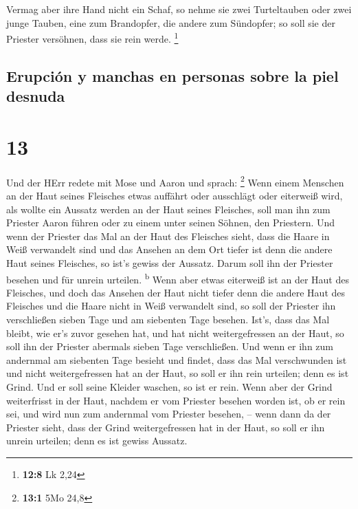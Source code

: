  Vermag aber ihre Hand nicht ein Schaf, so nehme sie zwei
Turteltauben oder zwei junge Tauben, eine zum Brandopfer, die andere zum
Sündopfer; so soll sie der Priester versöhnen, dass sie rein werde.
\footnote{\textbf{12:8} Lk 2,24}

\hypertarget{erupciuxf3n-y-manchas-en-personas-sobre-la-piel-desnuda}{%
\subsection{Erupción y manchas en personas sobre la piel
desnuda}\label{erupciuxf3n-y-manchas-en-personas-sobre-la-piel-desnuda}}

\hypertarget{section-12}{%
\section{13}\label{section-12}}

 Und der HErr redete mit Mose und Aaron und sprach:
\footnote{\textbf{13:1} 5Mo 24,8}  Wenn einem Menschen an
der Haut seines Fleisches etwas auffährt oder ausschlägt oder eiterweiß
wird, als wollte ein Aussatz werden an der Haut seines Fleisches, soll
man ihn zum Priester Aaron führen oder zu einem unter seinen Söhnen, den
Priestern.  Und wenn der Priester das Mal an der Haut des
Fleisches sieht, dass die Haare in Weiß verwandelt sind und das Ansehen
an dem Ort tiefer ist denn die andere Haut seines Fleisches, so ist's
gewiss der Aussatz. Darum soll ihn der Priester besehen und für unrein
urteilen. \textsuperscript{b}  Wenn aber etwas eiterweiß
ist an der Haut des Fleisches, und doch das Ansehen der Haut nicht
tiefer denn die andere Haut des Fleisches und die Haare nicht in Weiß
verwandelt sind, so soll der Priester ihn verschließen sieben Tage
 und am siebenten Tage besehen. Ist's, dass das Mal
bleibt, wie er's zuvor gesehen hat, und hat nicht weitergefressen an der
Haut,  so soll ihn der Priester abermals sieben Tage
verschließen. Und wenn er ihn zum andernmal am siebenten Tage besieht
und findet, dass das Mal verschwunden ist und nicht weitergefressen hat
an der Haut, so soll er ihn rein urteilen; denn es ist Grind. Und er
soll seine Kleider waschen, so ist er rein.  Wenn aber der
Grind weiterfrisst in der Haut, nachdem er vom Priester besehen worden
ist, ob er rein sei, und wird nun zum andernmal vom Priester besehen, --
 wenn dann da der Priester sieht, dass der Grind
weitergefressen hat in der Haut, so soll er ihn unrein urteilen; denn es
ist gewiss Aussatz.

